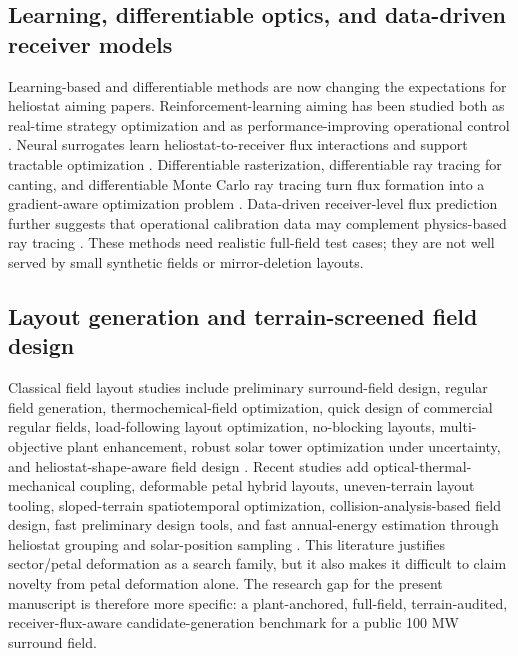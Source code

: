 \documentclass[final,3p,times]{elsarticle}
\begin{document}
\subsection{Learning, differentiable optics, and data-driven receiver models}
Learning-based and differentiable methods are now changing the expectations for heliostat aiming papers. Reinforcement-learning aiming has been studied both as real-time strategy optimization and as performance-improving operational control \cite{cruz2022rl,carballo2025rl}. Neural surrogates learn heliostat-to-receiver flux interactions and support tractable optimization \cite{alcantara2025nn}. Differentiable rasterization, differentiable ray tracing for canting, and differentiable Monte Carlo ray tracing turn flux formation into a gradient-aware optimization problem \cite{zheng2025diffneg,grange2025canting,lin2025dmcrt}. Data-driven receiver-level flux prediction further suggests that operational calibration data may complement physics-based ray tracing \cite{schiricke2025fluxprediction}. These methods need realistic full-field test cases; they are not well served by small synthetic fields or mirror-deletion layouts.

\subsection{Layout generation and terrain-screened field design}
Classical field layout studies include preliminary surround-field design, regular field generation, thermochemical-field optimization, quick design of commercial regular fields, load-following layout optimization, no-blocking layouts, multi-objective plant enhancement, robust solar tower optimization under uncertainty, and heliostat-shape-aware field design \cite{collado2009surrounding,collado2012campo,noone2011thermochemical,noone2019quick,ghirardi2021loadfollowing,derbal2023noblocking,guo2020multiobjective,li2022robust,chen2020shapes}. Recent studies add optical-thermal-mechanical coupling, deformable petal hybrid layouts, uneven-terrain layout tooling, sloped-terrain spatiotemporal optimization, collision-analysis-based field design, fast preliminary design tools, and fast annual-energy estimation through heliostat grouping and solar-position sampling \cite{yang2024otm,tang2025petal,ghazanfari2025hefaal,yu2026slopedterrain,adam2026heliosliders,biencinto2025hefesto,liu2026fastannual}. This literature justifies sector/petal deformation as a search family, but it also makes it difficult to claim novelty from petal deformation alone. The research gap for the present manuscript is therefore more specific: a plant-anchored, full-field, terrain-audited, receiver-flux-aware candidate-generation benchmark for a public 100 MW surround field.
\end{document}
